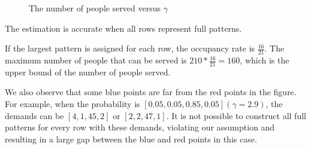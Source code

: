 \begin{figure}[h]
  \centering
  \caption{The number of people served versus $\gamma$}
\end{figure}

The estimation is accurate when all rows represent full patterns.


If the largest pattern is assigned for each row, the occupancy rate is $\frac{16}{21}$. The maximum number of people that can be served is $210 * \frac{16}{21} = 160$, which is the upper bound of the number of people served.

We also observe that some blue points are far from the red points in the figure. For example, when the probability is $[0.05, 0.05, 0.85, 0.05] (\gamma = 2.9)$, the demands can be $[4, 1, 45, 2]$ or $[2, 2, 47, 1]$. It is not possible to construct all full patterns for every row with these demands, violating our assumption and resulting in a large gap between the blue and red points in this case.




